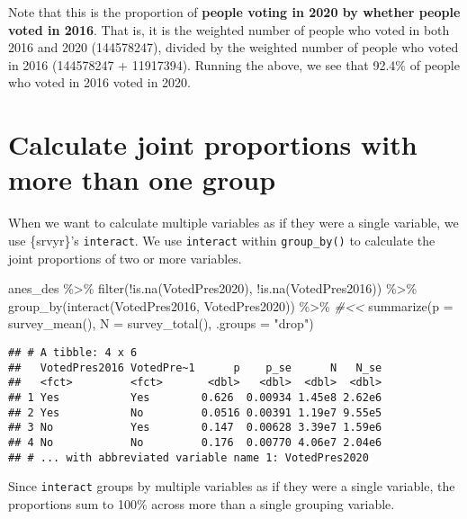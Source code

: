 \documentclass[
]{krantz}
\makeatletter
\newenvironment{Shaded}{\begin{snugshade}}{\end{snugshade}}
\newcommand{\AttributeTok}[1]{\textcolor[rgb]{0.61,0.61,0.61}{#1}}
\newcommand{\CommentTok}[1]{\textcolor[rgb]{0.37,0.37,0.37}{\textit{#1}}}
\newcommand{\FunctionTok}[1]{\textcolor[rgb]{0,0,0}{#1}}
\newcommand{\NormalTok}[1]{#1}
\newcommand{\SpecialCharTok}[1]{\textcolor[rgb]{0,0,0}{#1}}
\newcommand{\StringTok}[1]{\textcolor[rgb]{0.5,0.5,0.5}{#1}}
\newenvironment{kframe}{%
\medskip{}
\setlength{\fboxsep}{.8em}
 \def\at@end@of@kframe{}%
 \ifinner\ifhmode%
  \def\at@end@of@kframe{\end{minipage}}%
  \begin{minipage}{\columnwidth}%
 \fi\fi%
 \def\FrameCommand##1{\hskip\@totalleftmargin \hskip-\fboxsep
 \colorbox{shadecolor}{##1}\hskip-\fboxsep
     \hskip-\linewidth \hskip-\@totalleftmargin \hskip\columnwidth}%
 \MakeFramed {\advance\hsize-\width
   \@totalleftmargin\z@ \linewidth\hsize
   \@setminipage}}%
 {\par\unskip\endMakeFramed%
 \at@end@of@kframe}
\renewenvironment{Shaded}{\begin{kframe}}{\end{kframe}}
\makeatother
\begin{document}
Note that this is the proportion of \textbf{people voting in 2020 by whether people voted in 2016}. That is, it is the weighted number of people who voted in both 2016 and 2020 (144578247), divided by the weighted number of people who voted in 2016 (144578247 + 11917394). Running the above, we see that 92.4\% of people who voted in 2016 voted in 2020.

\hypertarget{calculate-joint-proportions-with-more-than-one-group}{%
\section{Calculate joint proportions with more than one group}\label{calculate-joint-proportions-with-more-than-one-group}}

When we want to calculate multiple variables as if they were a single variable, we use \{srvyr\}'s \texttt{interact}. We use \texttt{interact} within \texttt{group\_by()} to calculate the joint proportions of two or more variables.

\begin{Shaded}
\begin{Highlighting}[]
\NormalTok{anes\_des }\SpecialCharTok{\%\textgreater{}\%}
  \FunctionTok{filter}\NormalTok{(}\SpecialCharTok{!}\FunctionTok{is.na}\NormalTok{(VotedPres2020), }\SpecialCharTok{!}\FunctionTok{is.na}\NormalTok{(VotedPres2016)) }\SpecialCharTok{\%\textgreater{}\%}
  \FunctionTok{group\_by}\NormalTok{(}\FunctionTok{interact}\NormalTok{(VotedPres2016, VotedPres2020)) }\SpecialCharTok{\%\textgreater{}\%} \CommentTok{\#\textless{}\textless{}}
  \FunctionTok{summarize}\NormalTok{(}\AttributeTok{p =} \FunctionTok{survey\_mean}\NormalTok{(),}
            \AttributeTok{N =} \FunctionTok{survey\_total}\NormalTok{(),}
            \AttributeTok{.groups =} \StringTok{"drop"}\NormalTok{)}
\end{Highlighting}
\end{Shaded}

\begin{verbatim}
## # A tibble: 4 x 6
##   VotedPres2016 VotedPre~1      p    p_se      N   N_se
##   <fct>         <fct>       <dbl>   <dbl>  <dbl>  <dbl>
## 1 Yes           Yes        0.626  0.00934 1.45e8 2.62e6
## 2 Yes           No         0.0516 0.00391 1.19e7 9.55e5
## 3 No            Yes        0.147  0.00628 3.39e7 1.59e6
## 4 No            No         0.176  0.00770 4.06e7 2.04e6
## # ... with abbreviated variable name 1: VotedPres2020
\end{verbatim}

Since \texttt{interact} groups by multiple variables as if they were a single variable, the proportions sum to 100\% across more than a single grouping variable.
\end{document}
